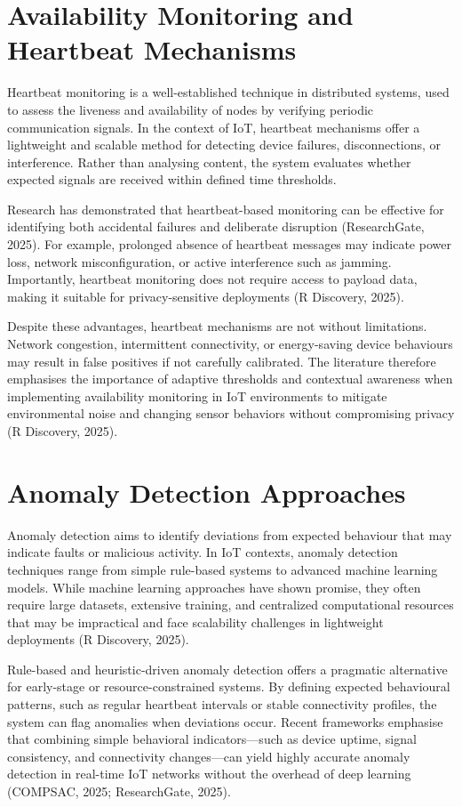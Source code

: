 \section{Availability Monitoring and Heartbeat Mechanisms}

Heartbeat monitoring is a well-established technique in distributed systems, used to assess the liveness and availability of nodes by verifying periodic communication signals. In the context of IoT, heartbeat mechanisms offer a lightweight and scalable method for detecting device failures, disconnections, or interference. Rather than analysing content, the system evaluates whether expected signals are received within defined time thresholds.

Research has demonstrated that heartbeat-based monitoring can be effective for identifying both accidental failures and deliberate disruption (ResearchGate, 2025). For example, prolonged absence of heartbeat messages may indicate power loss, network misconfiguration, or active interference such as jamming. Importantly, heartbeat monitoring does not require access to payload data, making it suitable for privacy-sensitive deployments (R Discovery, 2025).

Despite these advantages, heartbeat mechanisms are not without limitations. Network congestion, intermittent connectivity, or energy-saving device behaviours may result in false positives if not carefully calibrated. The literature therefore emphasises the importance of adaptive thresholds and contextual awareness when implementing availability monitoring in IoT environments to mitigate environmental noise and changing sensor behaviors without compromising privacy (R Discovery, 2025).

\section{Anomaly Detection Approaches}

Anomaly detection aims to identify deviations from expected behaviour that may indicate faults or malicious activity. In IoT contexts, anomaly detection techniques range from simple rule-based systems to advanced machine learning models. While machine learning approaches have shown promise, they often require large datasets, extensive training, and centralized computational resources that may be impractical and face scalability challenges in lightweight deployments (R Discovery, 2025).

Rule-based and heuristic-driven anomaly detection offers a pragmatic alternative for early-stage or resource-constrained systems. By defining expected behavioural patterns, such as regular heartbeat intervals or stable connectivity profiles, the system can flag anomalies when deviations occur. Recent frameworks emphasise that combining simple behavioral indicators---such as device uptime, signal consistency, and connectivity changes---can yield highly accurate anomaly detection in real-time IoT networks without the overhead of deep learning (COMPSAC, 2025; ResearchGate, 2025).

